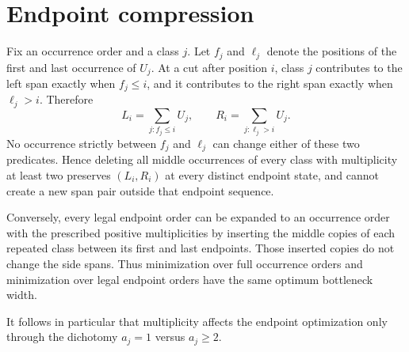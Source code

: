 \section{Endpoint compression}

Fix an occurrence order and a class $j$.  Let $f_j$ and $\ell_j$ denote the positions of the first and last occurrence of $U_j$.  At a cut after position $i$, class $j$ contributes to the left span exactly when $f_j\le i$, and it contributes to the right span exactly when $\ell_j>i$.  Therefore
\[
 L_i=\sum_{j:f_j\le i}U_j,
 \qquad
 R_i=\sum_{j:\ell_j>i}U_j.
\]
No occurrence strictly between $f_j$ and $\ell_j$ can change either of these two predicates.  Hence deleting all middle occurrences of every class with multiplicity at least two preserves $(L_i,R_i)$ at every distinct endpoint state, and cannot create a new span pair outside that endpoint sequence.

Conversely, every legal endpoint order can be expanded to an occurrence order with the prescribed positive multiplicities by inserting the middle copies of each repeated class between its first and last endpoints.  Those inserted copies do not change the side spans.  Thus minimization over full occurrence orders and minimization over legal endpoint orders have the same optimum bottleneck width.

It follows in particular that multiplicity affects the endpoint optimization only through the dichotomy $a_j=1$ versus $a_j\ge2$.
